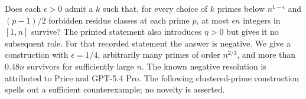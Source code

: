 Does each $\epsilon>0$ admit a $k$ such that, for every choice of $k$ primes below $n^{1-\epsilon}$ and $(p-1)/2$ forbidden residue classes at each prime $p$, at most $\epsilon n$ integers in $[1,n]$ survive? The printed statement also introduces $\eta>0$ but gives it no subsequent role. For that recorded statement the answer is negative. We give a construction with $\epsilon=1/4$, arbitrarily many primes of order $n^{2/3}$, and more than $0.48n$ survivors for sufficiently large $n$.
The known negative resolution is attributed to Price and GPT-5.4 Pro. The following clustered-prime construction spells out a sufficient counterexample; no novelty is asserted.
